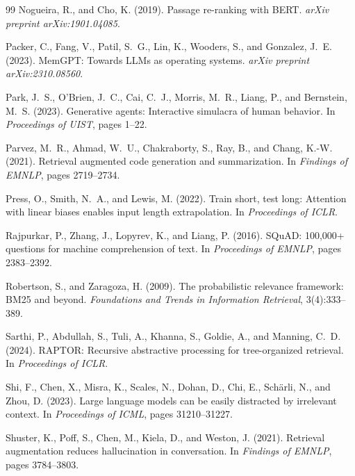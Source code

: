 \documentclass[review,12pt]{elsarticle}
\begin{document}
\begin{thebibliography}{99}
Nogueira, R., and Cho, K. (2019).
\newblock Passage re-ranking with BERT.
\newblock \textit{arXiv preprint arXiv:1901.04085}.

Packer, C., Fang, V., Patil, S.~G., Lin, K., Wooders, S., and Gonzalez, J.~E.
  (2023).
\newblock MemGPT: Towards LLMs as operating systems.
\newblock \textit{arXiv preprint arXiv:2310.08560}.

Park, J.~S., O'Brien, J.~C., Cai, C.~J., Morris, M.~R., Liang, P., and
  Bernstein, M.~S. (2023).
\newblock Generative agents: Interactive simulacra of human behavior.
\newblock In \textit{Proceedings of UIST}, pages 1--22.

Parvez, M.~R., Ahmad, W.~U., Chakraborty, S., Ray, B., and Chang, K.-W.
  (2021).
\newblock Retrieval augmented code generation and summarization.
\newblock In \textit{Findings of EMNLP}, pages 2719--2734.

Press, O., Smith, N.~A., and Lewis, M. (2022).
\newblock Train short, test long: Attention with linear biases enables input
  length extrapolation.
\newblock In \textit{Proceedings of ICLR}.

Rajpurkar, P., Zhang, J., Lopyrev, K., and Liang, P. (2016).
\newblock SQuAD: 100,000+ questions for machine comprehension of text.
\newblock In \textit{Proceedings of EMNLP}, pages 2383--2392.

Robertson, S., and Zaragoza, H. (2009).
\newblock The probabilistic relevance framework: BM25 and beyond.
\newblock \textit{Foundations and Trends in Information Retrieval},
  3(4):333--389.

Sarthi, P., Abdullah, S., Tuli, A., Khanna, S., Goldie, A., and Manning, C.~D.
  (2024).
\newblock RAPTOR: Recursive abstractive processing for tree-organized retrieval.
\newblock In \textit{Proceedings of ICLR}.

Shi, F., Chen, X., Misra, K., Scales, N., Dohan, D., Chi, E., Sch{\"a}rli, N.,
  and Zhou, D. (2023).
\newblock Large language models can be easily distracted by irrelevant context.
\newblock In \textit{Proceedings of ICML}, pages 31210--31227.

Shuster, K., Poff, S., Chen, M., Kiela, D., and Weston, J. (2021).
\newblock Retrieval augmentation reduces hallucination in conversation.
\newblock In \textit{Findings of EMNLP}, pages 3784--3803.


\end{thebibliography}
\end{document}
